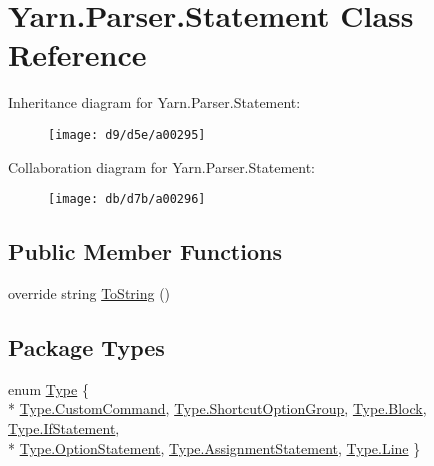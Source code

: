 \hypertarget{a00076}{\section{Yarn.\-Parser.\-Statement Class Reference}
\label{a00076}
}


Inheritance diagram for Yarn.\-Parser.\-Statement\-:
\nopagebreak
\begin{figure}[H]
\begin{center}
\leavevmode
\texttt{[image: d9/d5e/a00295]}
\end{center}
\end{figure}


Collaboration diagram for Yarn.\-Parser.\-Statement\-:
\nopagebreak
\begin{figure}[H]
\begin{center}
\leavevmode
\texttt{[image: db/d7b/a00296]}
\end{center}
\end{figure}
\subsection*{Public Member Functions}
\begin{DoxyCompactItemize}
\item 
override string \hyperlink{a00063_a18c67cb16090d0889bb9d6c8c6c565f8}{To\-String} ()
\end{DoxyCompactItemize}
\subsection*{Package Types}
\begin{DoxyCompactItemize}
\item 
enum \hyperlink{a00076_a518000e4e6219ce5f9f4229f505cd944}{Type} \{ \\*
\hyperlink{a00076_a518000e4e6219ce5f9f4229f505cd944af6b081742758e5cbc3a2e679e521a4fe}{Type.\-Custom\-Command}, 
\hyperlink{a00076_a518000e4e6219ce5f9f4229f505cd944ae8a0b2e51320b69d57d378776ee0647a}{Type.\-Shortcut\-Option\-Group}, 
\hyperlink{a00076_a518000e4e6219ce5f9f4229f505cd944ae1e4c8c9ccd9fc39c391da4bcd093fb2}{Type.\-Block}, 
\hyperlink{a00076_a518000e4e6219ce5f9f4229f505cd944a69bf1eda358268e97a9d792c0e88b10d}{Type.\-If\-Statement}, 
\\*
\hyperlink{a00076_a518000e4e6219ce5f9f4229f505cd944a7e5b9e4625bac525ed765621cb074ef7}{Type.\-Option\-Statement}, 
\hyperlink{a00076_a518000e4e6219ce5f9f4229f505cd944a4ee9d26530a9c097d63b74d383c48341}{Type.\-Assignment\-Statement}, 
\hyperlink{a00076_a518000e4e6219ce5f9f4229f505cd944a4803e6b9e63dabf04de980788d6a13c4}{Type.\-Line}
 \}
\end{DoxyCompactItemize}
